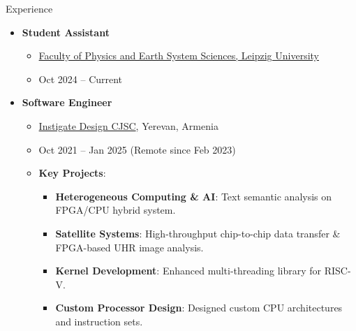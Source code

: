 \begin{frame}{Experience}
    \begin{itemize}
        \item \textbf{Student Assistant}
        \begin{itemize}
            \item \href{https://www.physes.uni-leipzig.de/}{Faculty of Physics and Earth System Sciences, Leipzig University}
            \item Oct 2024 -- Current
        \end{itemize}
        \vspace{0.5cm}
        \item \textbf{Software Engineer}
        \begin{itemize}
            \item \href{https://ggg.instigatedesign.com/}{Instigate Design CJSC}, Yerevan, Armenia
            \item Oct 2021 -- Jan 2025 (Remote since Feb 2023)
            \item \textbf{Key Projects}:
            \begin{itemize}
                \item \textbf{Heterogeneous Computing \& AI}: Text semantic analysis on FPGA/CPU hybrid system.
                \item \textbf{Satellite Systems}: High-throughput chip-to-chip data transfer \& FPGA-based UHR image analysis.
                \item \textbf{Kernel Development}: Enhanced multi-threading library for RISC-V.
                \item \textbf{Custom Processor Design}: Designed custom CPU architectures and instruction sets.
            \end{itemize}
        \end{itemize}
    \end{itemize}
\end{frame}

